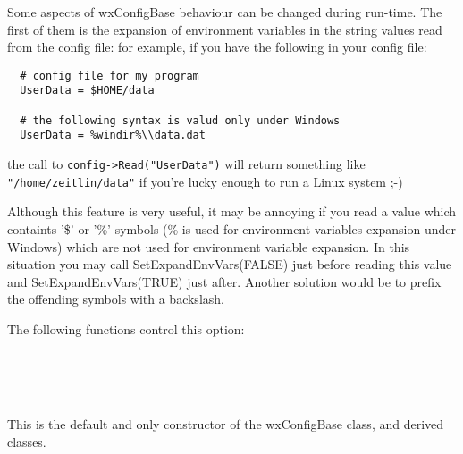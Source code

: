 
Some aspects of wxConfigBase behaviour can be changed during run-time. The
first of them is the expansion of environment variables in the string values
read from the config file: for example, if you have the following in your
config file:

\begin{verbatim}
  # config file for my program
  UserData = $HOME/data

  # the following syntax is valud only under Windows
  UserData = %windir%\\data.dat
\end{verbatim}

the call to \verb$config->Read("UserData")$ will return something like
\verb$"/home/zeitlin/data"$ if you're lucky enough to run a Linux system ;-)

Although this feature is very useful, it may be annoying if you read a value
which containts '\$' or '\%' symbols (\% is used for environment variables
expansion under Windows) which are not used for environment variable
expansion. In this situation you may call SetExpandEnvVars(FALSE) just before
reading this value and SetExpandEnvVars(TRUE) just after. Another solution
would be to prefix the offending symbols with a backslash.

The following functions control this option:

\\
\\
\\


\label{wxconfigbasector}


This is the default and only constructor of the wxConfigBase class, and derived classes.

